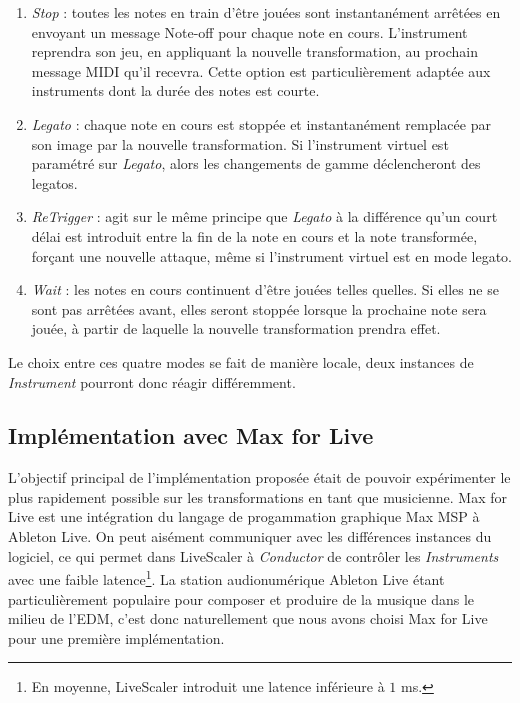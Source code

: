\documentclass{article}
\begin{document}
\begin{enumerate}
  \item \emph{Stop} : toutes les notes en train d'être jouées sont instantanément arrêtées en envoyant un message Note-off pour chaque note en cours. L'instrument reprendra son jeu, en appliquant la nouvelle transformation, au prochain message MIDI qu'il recevra. Cette option est particulièrement adaptée aux instruments dont la durée des notes est courte.
  \item \emph{Legato} : chaque note en cours est stoppée et instantanément remplacée par son image par la nouvelle transformation. Si l'instrument virtuel est paramétré sur \emph{Legato}, alors les changements de gamme déclencheront des legatos.
  \item \emph{ReTrigger} : agit sur le même principe que \emph{Legato} à la différence  qu'un court délai est introduit entre la fin de la note en cours et la note transformée, forçant une nouvelle attaque, même si l'instrument virtuel est en mode legato.
  \item \emph{Wait} : les notes en cours continuent d'être jouées telles quelles. Si elles ne se sont pas arrêtées avant, elles seront stoppée lorsque la prochaine note sera jouée, à partir de laquelle la nouvelle transformation prendra effet.
\end{enumerate}

Le choix entre ces quatre modes se fait de manière locale, deux instances de \emph{Instrument} pourront donc réagir différemment.

\subsection{Implémentation avec Max for Live}

L'objectif principal de l'implémentation proposée était de pouvoir expérimenter le plus rapidement possible sur les transformations en tant que musicienne. Max for Live est une intégration du  langage de progammation graphique Max MSP à Ableton Live. On peut aisément communiquer avec les différences instances du logiciel, ce qui permet dans LiveScaler à \emph{Conductor} de contrôler les \emph{Instruments} avec une faible latence\footnote{En moyenne, LiveScaler introduit une latence inférieure à $1$ ms.}. La station audionumérique Ableton Live étant particulièrement populaire pour composer et produire de la musique dans le milieu de l'EDM, c'est donc naturellement que nous avons choisi Max for Live pour une première implémentation.
\end{document}
